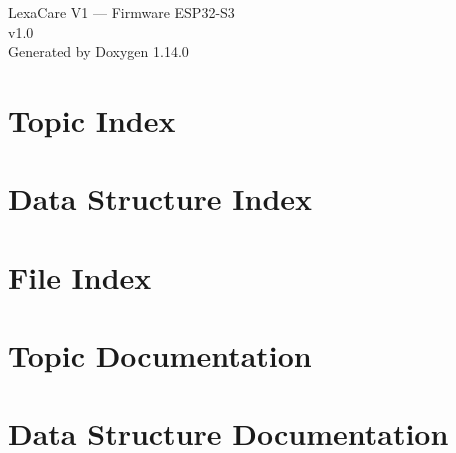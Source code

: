 \documentclass[twoside]{book}
\newcommand{\+}{\discretionary{\mbox{\scriptsize$\hookleftarrow$}}{}{}}
\newcommand{\clearemptydoublepage}{%
    \newpage{\pagestyle{empty}\cleardoublepage}%
  }
\begin{document}
  \raggedbottom
    \hypersetup{pageanchor=false,
                bookmarksnumbered=true,
                pdfencoding=unicode
               }
  \begin{titlepage}
  \vspace*{7cm}
  \begin{center}%
  {\Large Lexa\+Care V1 — Firmware ESP32-\/\+S3}\\
  [1ex]\large v1.\+0 \\
  \vspace*{1cm}
  {\large Generated by Doxygen 1.14.0}\\
  \end{center}
  \end{titlepage}
  \clearemptydoublepage
  \tableofcontents
  \clearemptydoublepage
  \hypersetup{pageanchor=true}
\chapter{Topic Index}

\chapter{Data Structure Index}

\chapter{File Index}

\chapter{Topic Documentation}








\chapter{Data Structure Documentation}
























\end{document}
